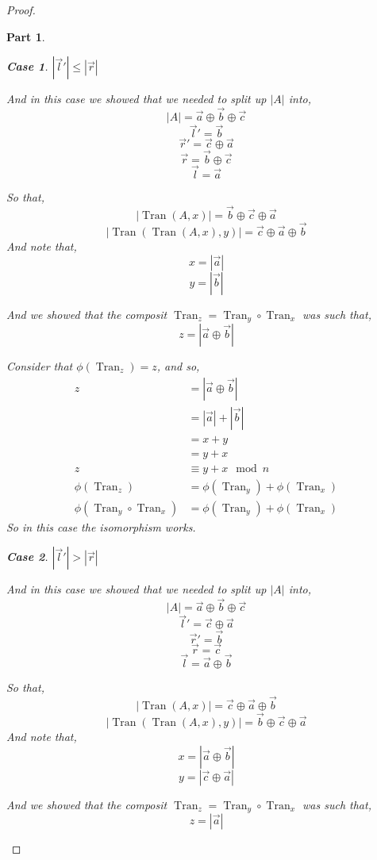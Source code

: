 \documentclass[12pt]{book}
\theoremstyle{definition}
\theoremstyle{plain}
\theoremstyle{ppart}
\newtheorem{ppart}{Part}
\theoremstyle{case}
\newtheorem{case}{Case}
\theoremstyle{solution}
\DeclareMathOperator{\Tran}{Tran}
\begin{document}
\begin{proof}
\begin{ppart}
\setcounter{case}{0}
\begin{case} $|\vec{l}'| \le |\vec{r}|$

And in this case we showed that we needed to split up $|A|$ into,
\[ |A| = \vec{a} \oplus \vec{b} \oplus \vec{c} \]
\[ \vec{l}' = \vec{b} \]
\[ \vec{r}' = \vec{c} \oplus \vec{a} \]
\[ \vec{r} = \vec{b} \oplus \vec{c} \]
\[ \vec{l} = \vec{a} \]

So that,
\[ |\Tran(A, x)| = \vec{b} \oplus \vec{c} \oplus \vec{a} \]
\[ |\Tran(\Tran(A, x), y)| = \vec{c} \oplus \vec{a} \oplus \vec{b} \]
And note that,
\[ x = |\vec{a}| \]
\[ y = |\vec{b}| \]

And we showed that the composit $\Tran_z = \Tran_y \circ \Tran_x$ was such
that,
\[ z = |\vec{a} \oplus \vec{b}| \]

Consider that $\phi(\Tran_z) = z$, and so,
\begin{align*}
  z
  &= |\vec{a} \oplus \vec{b}| \\
  &= |\vec{a}| + |\vec{b}| \\
  &= x + y \\
  &= y + x \\
  z &\equiv y + x \mod n \\
  \phi(\Tran_z) &= \phi(\Tran_y) + \phi(\Tran_x) \\
  \phi(\Tran_y \circ \Tran_x) &= \phi(\Tran_y) + \phi(\Tran_x)
\end{align*}
So in this case the isomorphism works.
\end{case}

\begin{case} $|\vec{l}'| > |\vec{r}|$

And in this case we showed that we needed to split up $|A|$ into,
\[ |A| = \vec{a} \oplus \vec{b} \oplus \vec{c} \]
\[ \vec{l}' = \vec{c} \oplus \vec{a} \]
\[ \vec{r}' = \vec{b} \]
\[ \vec{r} = \vec{c} \]
\[ \vec{l} = \vec{a} \oplus \vec{b} \]

So that,
\[ |\Tran(A, x)| = \vec{c} \oplus \vec{a} \oplus \vec{b} \]
\[ |\Tran(\Tran(A, x), y)| = \vec{b} \oplus \vec{c} \oplus \vec{a} \]
And note that,
\[ x = |\vec{a} \oplus \vec{b}| \]
\[ y = |\vec{c} \oplus \vec{a}| \]

And we showed that the composit $\Tran_z = \Tran_y \circ \Tran_x$ was such
that,
\[ z = |\vec{a}| \]


\end{case}
\end{ppart}
\end{proof}
\end{document}
